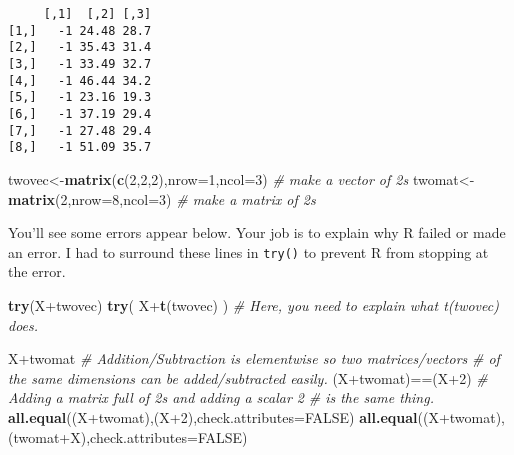 \documentclass[10pt,]{article}
\newenvironment{Shaded}{\begin{snugshade}}{\end{snugshade}}
\newcommand{\KeywordTok}[1]{\textcolor[rgb]{0.13,0.29,0.53}{\textbf{{#1}}}}
\newcommand{\DataTypeTok}[1]{\textcolor[rgb]{0.13,0.29,0.53}{{#1}}}
\newcommand{\DecValTok}[1]{\textcolor[rgb]{0.00,0.00,0.81}{{#1}}}
\newcommand{\CommentTok}[1]{\textcolor[rgb]{0.56,0.35,0.01}{\textit{{#1}}}}
\newcommand{\OtherTok}[1]{\textcolor[rgb]{0.56,0.35,0.01}{{#1}}}
\newcommand{\NormalTok}[1]{{#1}}
\begin{document}
\begin{verbatim}
     [,1]  [,2] [,3]
[1,]   -1 24.48 28.7
[2,]   -1 35.43 31.4
[3,]   -1 33.49 32.7
[4,]   -1 46.44 34.2
[5,]   -1 23.16 19.3
[6,]   -1 37.19 29.4
[7,]   -1 27.48 29.4
[8,]   -1 51.09 35.7
\end{verbatim}

\begin{Shaded}
\begin{Highlighting}[]
\NormalTok{twovec<-}\KeywordTok{matrix}\NormalTok{(}\KeywordTok{c}\NormalTok{(}\DecValTok{2}\NormalTok{,}\DecValTok{2}\NormalTok{,}\DecValTok{2}\NormalTok{),}\DataTypeTok{nrow=}\DecValTok{1}\NormalTok{,}\DataTypeTok{ncol=}\DecValTok{3}\NormalTok{)  }\CommentTok{# make a vector of 2s}
\NormalTok{twomat<-}\KeywordTok{matrix}\NormalTok{(}\DecValTok{2}\NormalTok{,}\DataTypeTok{nrow=}\DecValTok{8}\NormalTok{,}\DataTypeTok{ncol=}\DecValTok{3}\NormalTok{)  }\CommentTok{# make a matrix of 2s}
\end{Highlighting}
\end{Shaded}

You'll see some errors appear below. Your job is to explain why R failed
or made an error. I had to surround these lines in \texttt{try()} to
prevent R from stopping at the error.

\begin{Shaded}
\begin{Highlighting}[]
\KeywordTok{try}\NormalTok{(X+twovec)}
\KeywordTok{try}\NormalTok{( X+}\KeywordTok{t}\NormalTok{(twovec) )  }\CommentTok{# Here, you need to explain what t(twovec) does.}
\end{Highlighting}
\end{Shaded}

\begin{Shaded}
\begin{Highlighting}[]
\NormalTok{X+twomat}
\CommentTok{# Addition/Subtraction is elementwise so two matrices/vectors}
\CommentTok{# of the same dimensions can be added/subtracted easily.}
\NormalTok{(X+twomat)==(X}\DecValTok{+2}\NormalTok{)}
\CommentTok{# Adding a matrix full of 2s and adding a scalar 2}
\CommentTok{# is the same thing.}
\KeywordTok{all.equal}\NormalTok{((X+twomat),(X}\DecValTok{+2}\NormalTok{),}\DataTypeTok{check.attributes=}\OtherTok{FALSE}\NormalTok{)}
\KeywordTok{all.equal}\NormalTok{((X+twomat),(twomat+X),}\DataTypeTok{check.attributes=}\OtherTok{FALSE}\NormalTok{)}
\end{Highlighting}
\end{Shaded}
\end{document}
